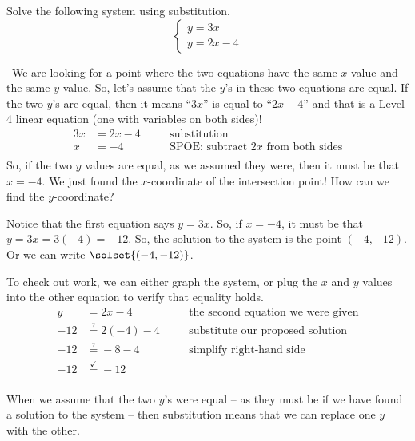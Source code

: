 
\begin{boxedex}
Solve the following system using substitution.
\[
\left\{%
\begin{array}{l}
y=3x\\
y=2x-4
\end{array}
\right.
\] 

\exsoln\ We are looking for a point where the two equations have the same $x$ value and the same $y$ value. So, let's assume that the $y$'s in these two equations  are equal. If the two $y$'s are equal, then it means ``$3x$'' is equal to ``$2x-4$'' and that is a Level 4 linear equation (one with variables on both sides)!
\[\begin{aligned}
3x &= 2x -4
&& \quad\text{substitution}\\
x &= -4
&& \quad\text{SPOE: subtract $2x$ from both sides}\\
\end{aligned}\]
So, if the two $y$ values are equal, as we assumed they were, then it must be that $x=-4$. We just found the $x$-coordinate of the intersection point! How can we find the $y$-coordinate?

Notice that the first equation says $y = 3x$. So, if $x=-4$, it must be that $y = 3x = 3(-4) = -12$. So, the solution to the system is the point $(-4, -12)$. Or we can write $\solset{(-4,-12)}$.

To check out work, we can either graph the system, or plug the $x$ and $y$ values into the other equation to verify that equality holds.
\[\begin{aligned}
y &= 2x -4
&& \quad\text{the second equation we were given}\\
-12 &\overset{?}{=} 2(-4)-4
&& \quad\text{substitute our proposed solution}\\
-12 &\overset{?}{=} -8-4
&& \quad\text{simplify right-hand side}\\
-12 &\overset{\checkmark}{=} -12
&& \quad\text{}\\
\end{aligned}\]
\end{boxedex}

When we assume that the two $y$'s were equal -- as they must be if we have found a solution to the system -- then substitution means that we can replace one $y$ with the other.

